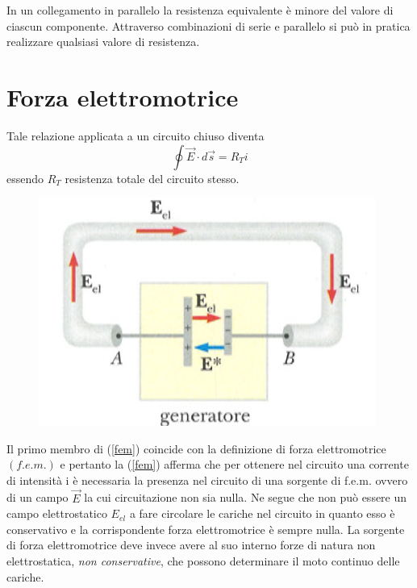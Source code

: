 \documentclass[class=book, crop=false, oneside, 12pt]{standalone}
\begin{document}
In un collegamento in parallelo la resistenza equivalente è minore del valore di ciascun componente.  
Attraverso combinazioni di serie e parallelo si può in pratica realizzare qualsiasi valore di resistenza.

\section{Forza elettromotrice}

Tale relazione applicata a un circuito chiuso diventa
\begin{equation} \label{fem}
    \oint \overrightarrow{E} \cdot d \overrightarrow{s} = R_T i 
\end{equation}
essendo \(R_T\) resistenza totale del circuito stesso.

\begin{figure}[h]
    \includegraphics[scale=0.6]{campi_circuito.png}
    \centering
    \caption{}
\end{figure}

Il primo membro di (\ref{fem}) coincide con la definizione di forza elettromotrice \((f.e.m.)\) e pertanto la (\ref{fem}) afferma che per ottenere nel circuito una corrente di intensità i è necessaria la presenza nel circuito di una sorgente di f.e.m. ovvero di un campo \(\overrightarrow{E}\) la cui circuitazione non sia nulla. 
Ne segue che non può essere un campo elettrostatico \(E_{el}\) a fare circolare le cariche nel circuito in quanto esso è conservativo e la corrispondente forza elettromotrice è sempre nulla. 
La sorgente di forza elettromotrice deve invece avere al suo interno forze di natura non elettrostatica, \emph{non conservative}, che possono determinare il moto continuo delle cariche. 
\end{document}
